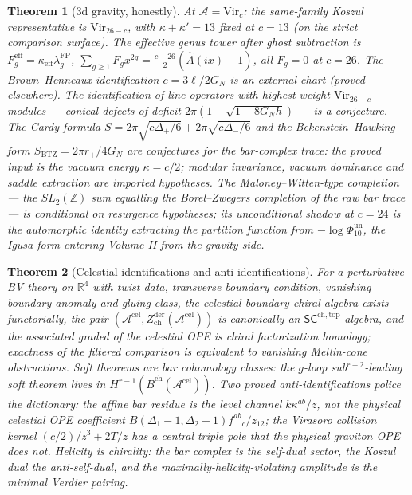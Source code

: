 \documentclass[11pt]{article}
\providecommand{\cA}{\mathcal{A}}
\providecommand{\bR}{\mathbb{R}}
\providecommand{\bZ}{\mathbb{Z}}
\providecommand{\barB}{\overline{B}}
\providecommand{\Vir}{\mathrm{Vir}}
\providecommand{\Zder}{Z^{\mathrm{der}}_{\mathrm{ch}}}
\providecommand{\SCchtop}{\mathsf{SC}^{\mathrm{ch,top}}}
\providecommand{\Phiten}{\Phi_{10}}
\newtheorem{theorem}{Theorem}[section]
\begin{document}
\begin{theorem}[3d gravity, honestly]\label{thm:gravity}
At $\cA=\Vir_c$: the same-family Koszul representative is
$\Vir_{26-c}$, with $\kappa+\kappa'=13$ fixed at $c=13$ \textup{(on the
strict comparison surface)}. The effective genus tower after ghost
subtraction is
$F^{\mathrm{eff}}_g=\kappa_{\mathrm{eff}}\lambda_g^{\mathrm{FP}}$,
$\sum_{g\ge1}F_gx^{2g}=\frac{c-26}{2}(\hat A(ix)-1)$, all $F_g=0$ at
$c=26$. The Brown--Henneaux identification $c=3\ell/2G_N$ is an
external chart \textup{(proved elsewhere)}. The identification of line
operators with highest-weight $\Vir_{26-c}$-modules --- conical
defects of deficit $2\pi(1-\sqrt{1-8G_Nh})$ --- is a
\emph{conjecture}. The Cardy formula
$S=2\pi\sqrt{c\Delta_+/6}+2\pi\sqrt{c\Delta_-/6}$ and the
Bekenstein--Hawking form $S_{\mathrm{BTZ}}=2\pi r_+/4G_N$ are
\emph{conjectures} for the bar-complex trace: the proved input is the
vacuum energy $\kappa=c/2$; modular invariance, vacuum dominance and
saddle extraction are imported hypotheses. The Maloney--Witten-type
completion --- the $SL_2(\bZ)$ sum equalling the Borel--Zwegers
completion of the raw bar trace --- is conditional on resurgence
hypotheses; its unconditional shadow at $c=24$ is the automorphic
identity extracting the partition function from
$-\log\Phiten^{\mathrm{un}}$, the Igusa form entering Volume II from
the gravity side.
\end{theorem}

\begin{theorem}[Celestial identifications and anti-identifications]
\label{thm:celestial}
For a perturbative BV theory on $\bR^4$ with twist data, transverse
boundary condition, vanishing boundary anomaly and gluing class, the
celestial boundary chiral algebra exists functorially, the pair
$(\cA^{\mathrm{cel}},\Zder(\cA^{\mathrm{cel}}))$ is canonically an
$\SCchtop$-algebra, and the associated graded of the celestial OPE is
chiral factorization homology; exactness of the filtered comparison is
equivalent to vanishing Mellin-cone obstructions. Soft theorems are bar
cohomology classes: the $g$-loop sub$^{r-2}$-leading soft theorem lives
in $H^{r-1}(\barB^{\mathrm{ch}}(\cA^{\mathrm{cel}}))$. Two proved
\emph{anti}-identifications police the dictionary: the affine bar
residue is the level channel $k\kappa^{ab}/z$, not the physical
celestial OPE coefficient
$B(\Delta_1{-}1,\Delta_2{-}1)f^{ab}{}_c/z_{12}$; the Virasoro collision
kernel $(c/2)/z^3+2T/z$ has a central triple pole that the physical
graviton OPE does not. Helicity is chirality: the bar complex is the
self-dual sector, the Koszul dual the anti-self-dual, and the
maximally-helicity-violating amplitude is the minimal Verdier pairing.
\end{theorem}
\end{document}
